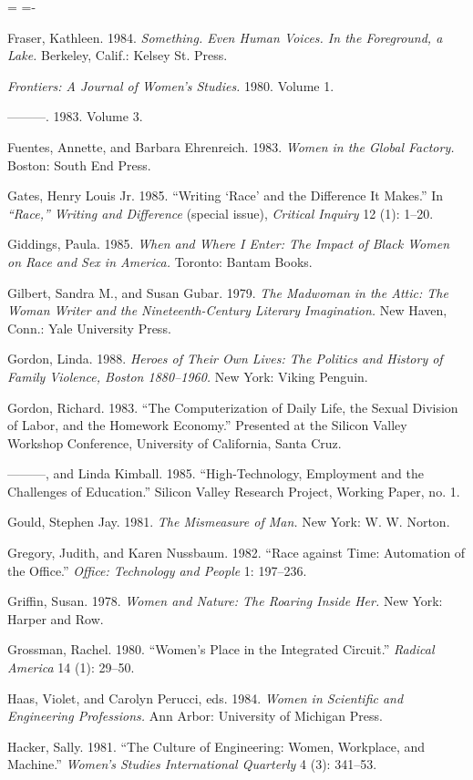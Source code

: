\documentclass[DIV=12,%
               BCOR=10mm,%
               headinclude=false,%
               footinclude=false,open=any,%
               fontsize=11pt,%
               twoside,%
               paper=210mm:11in]%
               {scrbook}
\newenvironment*{amusebiblio}{
  \leftskip=\parindent
  \parindent=-\parindent
  \smallskip
  \indent
}{\smallskip}
\begin{document}
\begin{amusebiblio}
Fraser, Kathleen. 1984. \emph{Something. Even Human Voices. In the Foreground, a Lake.} Berkeley, Calif.: Kelsey St. Press.


\emph{Frontiers: A Journal of Women’s Studies.} 1980. Volume 1.


———. 1983. Volume 3.


Fuentes, Annette, and Barbara Ehrenreich. 1983. \emph{Women in the Global Factory.} Boston: South End Press.


Gates, Henry Louis Jr. 1985. “Writing ‘Race’ and the Difference It Makes.” In \emph{“Race,” Writing and Difference} (special issue), \emph{Critical Inquiry} 12 (1): 1–20.


Giddings, Paula. 1985. \emph{When and Where I Enter: The Impact of Black Women on Race and Sex in America.} Toronto: Bantam Books.


Gilbert, Sandra M., and Susan Gubar. 1979. \emph{The Madwoman in the Attic: The Woman Writer and the Nineteenth-Century Literary Imagination.} New Haven, Conn.: Yale University Press.


Gordon, Linda. 1988. \emph{Heroes of Their Own Lives: The Politics and History of Family Violence, Boston 1880–1960.} New York: Viking Penguin.


Gordon, Richard. 1983. “The Computerization of Daily Life, the Sexual Division of Labor, and the Homework Economy.” Presented at the Silicon Valley Workshop Conference, University of California, Santa Cruz.


———, and Linda Kimball. 1985. “High-Technology, Employment and the Challenges of Education.” Silicon Valley Research Project, Working Paper, no. 1.


Gould, Stephen Jay. 1981. \emph{The Mismeasure of Man.} New York: W. W. Norton.


Gregory, Judith, and Karen Nussbaum. 1982. “Race against Time: Automation of the Office.” \emph{Office: Technology and People} 1: 197–236.


Griffin, Susan. 1978. \emph{Women and Nature: The Roaring Inside Her.} New York: Harper and Row.


Grossman, Rachel. 1980. “Women’s Place in the Integrated Circuit.” \emph{Radical America} 14 (1): 29–50.


Haas, Violet, and Carolyn Perucci, eds. 1984. \emph{Women in Scientific and Engineering Professions.} Ann Arbor: University of Michigan Press.


Hacker, Sally. 1981. “The Culture of Engineering: Women, Workplace, and Machine.” \emph{Women’s Studies International Quarterly} 4 (3): 341–53.



\end{amusebiblio}
\end{document}

